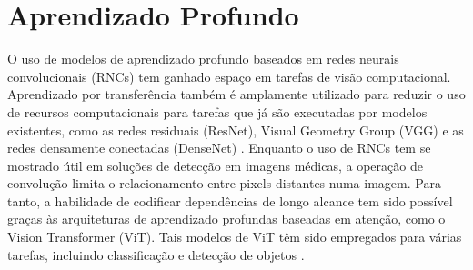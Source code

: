 \section{Aprendizado Profundo}\label{sec:aprendizado-profundo}

O uso de modelos de aprendizado profundo baseados em redes neurais convolucionais (RNCs) tem ganhado espaço em tarefas de visão computacional. Aprendizado por transferência também é amplamente utilizado para reduzir o uso de recursos computacionais para tarefas que já são executadas por modelos existentes, como as redes residuais (ResNet), Visual Geometry Group (VGG) e as redes densamente conectadas (DenseNet) \cite{Tariq2023}. Enquanto o uso de RNCs tem se mostrado útil em soluções de detecção em imagens médicas, a operação de convolução limita o relacionamento entre pixels distantes numa imagem. Para tanto, a habilidade de codificar dependências de longo alcance tem sido possível graças às arquiteturas de aprendizado profundas baseadas em atenção, como o Vision Transformer (ViT). Tais modelos de ViT têm sido empregados para várias tarefas, incluindo classificação e detecção de objetos \cite{Shamshad2023}.

